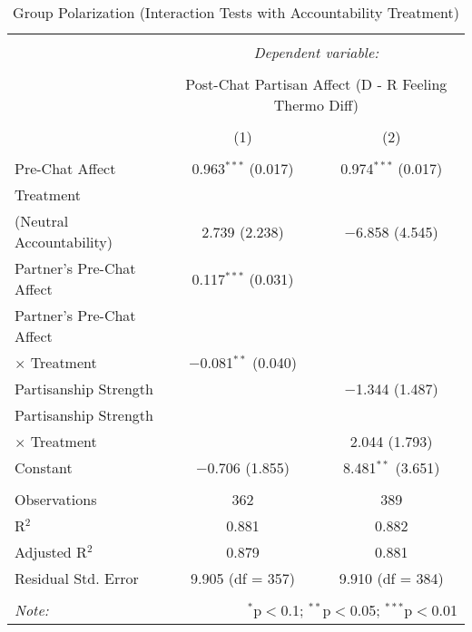 
\begin{table}[H] \centering 
  \caption{Group Polarization (Interaction Tests with Accountability Treatment)} 
  \label{tab:s2_group_polarization_interactions_withtreat} 
\begin{tabular}{@{\extracolsep{5pt}}lcc} 
\\[-1.8ex]\hline 
\hline \\[-1.8ex] 
 & \multicolumn{2}{c}{\textit{Dependent variable:}} \\ 
\cline{2-3} 
\\[-1.8ex] & \multicolumn{2}{c}{Post-Chat Partisan Affect (D - R Feeling Thermo Diff)} \\ 
\\[-1.8ex] & (1) & (2)\\ 
\hline \\[-1.8ex] 
 Pre-Chat Affect & 0.963$^{***}$ (0.017) & 0.974$^{***}$ (0.017) \\ 
  Treatment\\(Neutral Accountability) & 2.739 (2.238) & $-$6.858 (4.545) \\ 
  Partner's Pre-Chat Affect & 0.117$^{***}$ (0.031) &  \\ 
  Partner's Pre-Chat Affect\\$\times$ Treatment & $-$0.081$^{**}$ (0.040) &  \\ 
  Partisanship Strength &  & $-$1.344 (1.487) \\ 
  Partisanship Strength\\$\times$ Treatment &  & 2.044 (1.793) \\ 
  Constant & $-$0.706 (1.855) & 8.481$^{**}$ (3.651) \\ 
 \hline \\[-1.8ex] 
Observations & 362 & 389 \\ 
R$^{2}$ & 0.881 & 0.882 \\ 
Adjusted R$^{2}$ & 0.879 & 0.881 \\ 
Residual Std. Error & 9.905 (df = 357) & 9.910 (df = 384) \\ 
\hline 
\hline \\[-1.8ex] 
\textit{Note:}  & \multicolumn{2}{r}{$^{*}$p$<$0.1; $^{**}$p$<$0.05; $^{***}$p$<$0.01} \\ 
\end{tabular} 
\end{table} 
